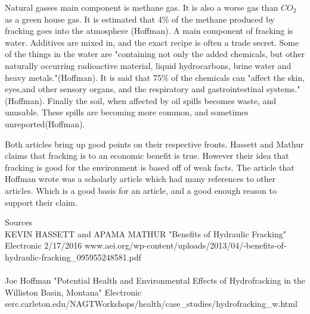 \documentclass[12pt]{article}
\begin{document}
Natural gasses main component is 
methane gas. It is also a worse gas than $CO_2$ as a green house gas. It is estimated that 4\% of the methane produced by fracking goes into the atmosphere (Hoffman). A main component of fracking is water. Additives are mixed in, and the exact recipe is often a trade secret. Some of the things in the water are "containing not only the added chemicals, but other naturally occurring radioactive material, liquid hydrocarbons, brine water and heavy metals."(Hoffman). It is said that 75\% of the chemicals can "affect the skin, eyes,and other sensory organs, and the respiratory and gastrointestinal systems." (Hoffman). Finally the soil, when affected by oil spills becomes waste, and unusable. These spills are becoming more common, and sometimes unreported(Hoffman).

Both articles bring up good points on their respective fronts. Hassett and Mathur claims that fracking is to an economic benefit is true. However their idea that fracking is good for the environment is based off of weak facts. The article that Hoffman wrote was a scholarly article which had many references to other articles. Which is a good basis for an article, and a good enough reason to support their claim.  

\singlespacing
\noindent \large{Sources}\\
KEVIN HASSETT and APAMA MATHUR "Benefits of Hydraulic Fracking" Electronic 
2/17/2016 www.aei.org/wp-content/uploads/2013/04/-benefits-of-hydraulic-fracking\_095955248581.pdf 
\\
\\
Joe Hoffman "Potential Health and Environmental Effects of Hydrofracking in the Williston Basin, Montana" Electronic serc.carleton.edu/NAGTWorkshops/health/case\_studies/hydrofracking\_w.html
\end{document}

